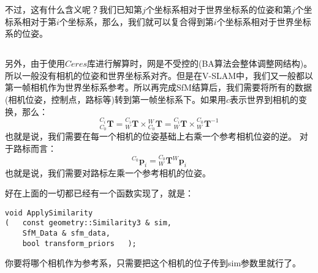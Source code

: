 \documentclass[12pt, twocolumn]{article}
\newcommand{\normf}{\kaishu}
\begin{document}
	不过，这有什么含义呢？我们已知第$j$个坐标系相对于世界坐标系的位姿和第$j$个坐标系相对于第$i$个坐标系，那么，我们就可以复合得到第$i$个坐标系相对于世界坐标系的位姿。
	
	\subsection{\normf{归化参考坐标系}}
	另外，由于使用$Ceres$库进行解算时，网是不受控的(BA算法会整体调整网结构)。所以一般没有相机的位姿和世界坐标系对齐。但是在V-SLAM中，我们又一般都以第一帧相机作为世界坐标系参考。所以再完成SfM结算后，我们需要将所有的数据(相机位姿，控制点，路标等)转到第一帧坐标系下。如果用$c$表示世界到相机的变换，那么：
	\begin{equation*}
		{^{C_i}_{C_0}\boldsymbol{T}}={^{C_i}_{W}\boldsymbol{T}}\times{^{W}_{C_0}\boldsymbol{T}}={^{C_i}_{W}\boldsymbol{T}}\times{^{C_0}_{W}\boldsymbol{T}^{-1}}
	\end{equation*}
	也就是说，我们需要在每一个相机的位姿基础上右乘一个参考相机位姿的逆。
	对于路标而言：
	\begin{equation*}
		{^{C_0}\boldsymbol{p}_i}={^{C_0}_{W}\boldsymbol{T}}{^{W}\boldsymbol{p}_i}
	\end{equation*}
	也就是说，我们需要对路标左乘一个参考相机的位姿。
	
	好在上面的一切都已经有一个函数实现了，就是：
			\begin{lstlisting}[label=code2,caption={\normf 位姿复合}]
void ApplySimilarity
(	const geometry::Similarity3 & sim,
	SfM_Data & sfm_data,
	bool transform_priors	);
	\end{lstlisting}
	你要将哪个相机作为参考系，只需要把这个相机的位子传到sim参数里就行了。
	
\end{document}

